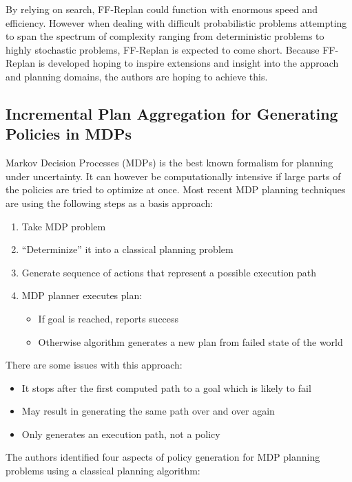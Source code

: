 \documentclass[runningheads,a4paper]{llncs}
\begin{document}
By relying on search, FF-Replan could function with enormous speed and efficiency. However when dealing with difficult probabilistic problems attempting to span the spectrum of complexity ranging from deterministic problems to highly stochastic problems, FF-Replan is expected to come short. Because FF-Replan is developed hoping to inspire extensions and insight into the approach and planning domains, the authors are hoping to achieve this.

\subsection{Incremental Plan Aggregation for Generating Policies in MDPs}

Markov Decision Processes (MDPs) is the best known formalism for planning under
uncertainty. It can however be computationally intensive if large parts of the
policies are tried to optimize at once. Most recent MDP planning techniques are
using the following steps as a basis approach:

\begin{enumerate}
	\item Take MDP problem
	\item ``Determinize''  it into a classical planning problem
	\item Generate sequence of actions that represent a possible execution
		path
	\item MDP planner executes plan:
		\begin{itemize}
			\item If goal is reached, reports success
			\item Otherwise algorithm generates a new plan from failed state of
				the world
		\end{itemize}
\end{enumerate}

There are some issues with this approach:

\begin{itemize}
	\item It stops after the first computed path to a goal which is likely to fail
	\item May result in generating the same path over and over again
	\item Only generates an execution path, not a policy
\end{itemize}

The authors identified four aspects of policy generation for MDP planning
problems using a classical planning algorithm:
\end{document}
